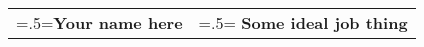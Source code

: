 \documentclass[class=article, crop=false]{standalone}
\begin{document}
\begin{centering}

    \begin{tabularx}{\textwidth}{
        >{\raggedright\hsize=.5\hsize\linewidth=\hsize}X
        >{\raggedleft\hsize=.5\hsize\linewidth=\hsize}X
    } 

    \textbf{\Huge Your name here} &
    \textbf{\Large Some ideal job thing}

    \end{tabularx}

\end{centering}



\vspace{0mm}
\end{document}
